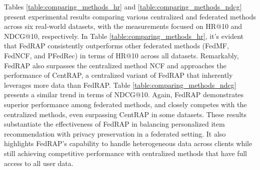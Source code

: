 \documentclass{article} %
\begin{document}
Tables \ref{table:comparing_methods_hr} and \ref{table:comparing_methods_ndcg} present experimental results comparing various centralized and federated methods across six real-world datasets, with the measurements focused on HR@10 and NDCG@10, respectively.
In Table \ref{table:comparing_methods_hr}, it's evident that FedRAP consistently outperforms other federated methods (FedMF, FedNCF, and PFedRec) in terms of HR@10 across all datasets. Remarkably, FedRAP also surpasses the centralized method NCF and approaches the performance of CentRAP, a centralized variant of FedRAP that inherently leverages more data than FedRAP.
Table \ref{table:comparing_methods_ndcg} presents a similar trend in terms of NDCG@10. Again, FedRAP demonstrates superior performance among federated methods, and closely competes with the centralized methods, even surpassing CentRAP in some datasets.
These results substantiate the effectiveness of FedRAP in balancing personalized item recommendation with privacy preservation in a federated setting. It also highlights FedRAP's capability to handle heterogeneous data across clients while still achieving competitive performance with centralized methods that have full access to all user data.
\end{document}
